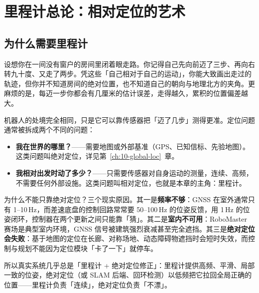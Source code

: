﻿\chapter{里程计总论：相对定位的艺术}\label{ch:04-odom-intro}


\section{为什么需要里程计}\label{sec:04-why}

设想你在一间没有窗户的房间里闭着眼走路。你记得自己先向前迈了三步、再向右转九十度、又走了两步。凭这些「自己相对于自己的运动」，你能大致画出走过的轨迹，但你并不知道房间的绝对位置，也不知道自己的朝向与地理北方的夹角。更麻烦的是，每迈一步你都会有几厘米的估计误差，走得越久，累积的位置偏差越大。

机器人的处境完全相同，只是它可以靠传感器把「迈了几步」测得更准。定位问题通常被拆成两个不同的问题：

\begin{itemize}
  \item \textbf{我在世界的哪里？}——需要地图或外部基准（GPS、已知信标、先验地图）。这类问题叫绝对定位，详见第~\ref{ch:10-global-loc}~章。
  \item \textbf{我相对出发时动了多少？}——只需要传感器对自身运动的测量，连续、高频，不需要任何外部设施。这类问题叫相对定位，也就是本章的主角：里程计。
\end{itemize}

为什么不能只靠绝对定位？三个现实原因。其一是\textbf{频率不够}：GNSS 在室外通常只有 1--10\,Hz，而差速底盘的控制回路常常要 50--100\,Hz 的位姿反馈，用 1\,Hz 的位姿闭环，控制器在两个更新之间只能靠「猜」。其二是\textbf{室内不可用}：RoboMaster 赛场是典型室内环境，GNSS 信号被建筑强烈衰减甚至完全遮挡。其三是\textbf{绝对定位会失败}：基于地图的定位在长廊、对称场地、动态障碍物遮挡时会短时失效，而控制与规划不能因为定位模块「卡了一下」就停车。

所以真实系统几乎总是「里程计 + 绝对定位修正」：里程计提供高频、平滑、局部一致的位姿，绝对定位（或 SLAM 后端、回环检测）以低频把它拉回全局正确的位置——里程计负责「连续」，绝对定位负责「不漂」。

